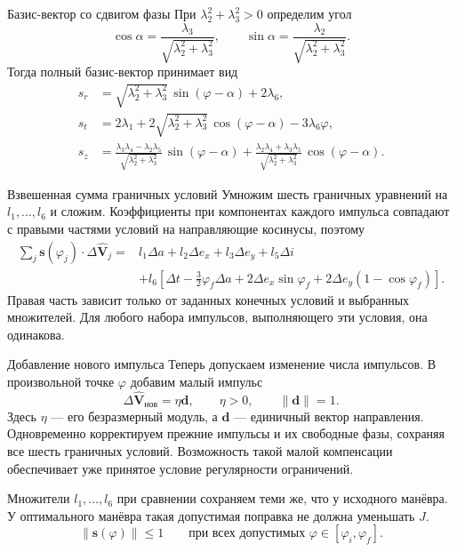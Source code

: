 \documentclass[11pt,aspectratio=169,t]{beamer}
\newcommand{\eqcompact}{\fontsize{10}{12}\selectfont}
\begin{document}
\begin{frame}{Базис-вектор со сдвигом фазы}
\relax
\derivationmathspacing
При $\lambda_2^2+\lambda_3^2>0$ определим угол
{\eqcompact\derivationmathspacing
\setlength{\jot}{0pt}
\[
\cos\alpha=\frac{\lambda_3}{\sqrt{\lambda_2^2+\lambda_3^2}},
 \qquad
 \sin\alpha=\frac{\lambda_2}{\sqrt{\lambda_2^2+\lambda_3^2}}.
\]
}
Тогда полный базис-вектор принимает вид
{\eqcompact\derivationmathspacing
\setlength{\jot}{0pt}
\[
\boxed{\begin{aligned}
 s_r&=\sqrt{\lambda_2^2+\lambda_3^2}\,\sin(\varphi-\alpha)+2\lambda_6,\\
 s_t&=2\lambda_1+2\sqrt{\lambda_2^2+\lambda_3^2}\,
                       \cos(\varphi-\alpha)-3\lambda_6\varphi,\\
 s_z&=\frac{\lambda_3\lambda_4-\lambda_2\lambda_5}
                {\sqrt{\lambda_2^2+\lambda_3^2}}\,\sin(\varphi-\alpha)+\frac{\lambda_2\lambda_4+\lambda_3\lambda_5}
                {\sqrt{\lambda_2^2+\lambda_3^2}}\,\cos(\varphi-\alpha).
\end{aligned}}
\]
}
\end{frame}

\begin{frame}{Взвешенная сумма граничных условий}
\relax
\derivationmathspacing
\justifying
Умножим шесть граничных уравнений на $l_1,\ldots,l_6$ и сложим.
Коэффициенты при компонентах каждого импульса совпадают
с правыми частями условий на направляющие косинусы, поэтому
{\derivationmathspacing
\[
\begin{aligned}
 \sum\nolimits_j\boldsymbol s(\varphi_j)\cdot\Delta\widehat{\boldsymbol V}_j
   ={}&l_1\Delta a+l_2\Delta e_x+l_3\Delta e_y+l_5\Delta i\\
      &+l_6\left[\Delta t-\frac32\varphi_f\Delta a
          +2\Delta e_x\sin\varphi_f+2\Delta e_y(1-\cos\varphi_f)\right].
\end{aligned}
\]
}
\medskip
\justifying
Правая часть зависит только от заданных конечных условий
и выбранных множителей. Для любого набора импульсов,
выполняющего эти условия, она одинакова.
\end{frame}

\begin{frame}{Добавление нового импульса}
\relax
\derivationmathspacing
\justifying
Теперь допускаем изменение числа импульсов. В произвольной
точке $\varphi$ добавим малый импульс
\[
 \Delta\widehat{\boldsymbol V}_{\text{нов}}=\eta\boldsymbol d,
 \qquad \eta>0,\qquad \|\boldsymbol d\|=1.
\]
Здесь $\eta$ --- его безразмерный модуль, а $\boldsymbol d$ ---
единичный вектор направления. Одновременно корректируем прежние
импульсы и их свободные фазы, сохраняя все шесть граничных условий.
Возможность такой малой компенсации обеспечивает уже принятое
условие регулярности ограничений.
\par\smallskip
Множители $l_1,\ldots,l_6$ при сравнении сохраняем теми же,
что у исходного манёвра. У оптимального манёвра такая допустимая
поправка не должна уменьшать $J$.
{\derivationmathspacing
\[
\|\boldsymbol s(\varphi)\|\leq1
 \qquad\text{при всех допустимых }\varphi\in[\varphi_i,\varphi_f].
\]
}
\end{frame}
\end{document}
